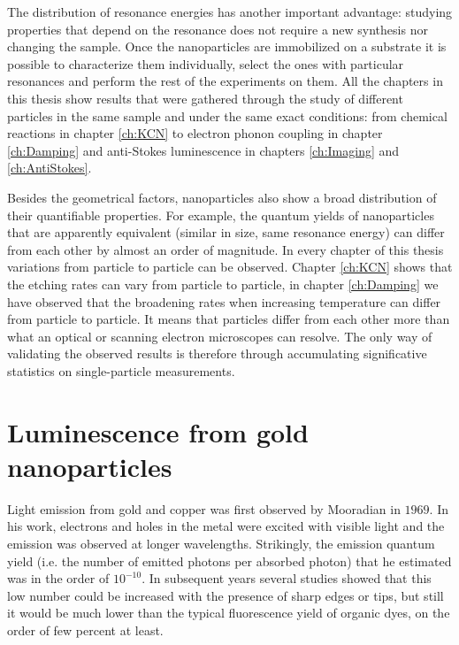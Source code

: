 The distribution of resonance energies has another important advantage: studying
properties that depend on the resonance does not require a new synthesis nor
changing the sample. Once the nanoparticles are immobilized on a substrate it is
possible to characterize them individually, select the ones with particular
resonances and perform the rest of the experiments on them. All the chapters in
this thesis show results that were gathered through the study of different
particles in the same sample and under the same exact conditions: from chemical
reactions in chapter \ref{ch:KCN} to electron phonon coupling in chapter
\ref{ch:Damping} and anti-Stokes luminescence in chapters \ref{ch:Imaging} and
\ref{ch:AntiStokes}.

Besides the geometrical factors, nanoparticles also show a broad distribution of
their quantifiable properties. For example, the quantum yields of nanoparticles
that are apparently equivalent (similar in size, same resonance energy) can
differ from each other by almost an order of magnitude\cite{Yorulmaz2012}. In
every chapter of this thesis variations from particle to particle can be
observed. Chapter \ref{ch:KCN} shows that the etching rates can vary from
particle to particle, in chapter \ref{ch:Damping} we have observed that the
broadening rates when increasing temperature can differ from particle to
particle. It means that particles differ from each other more than what an
optical or scanning electron microscopes can resolve. The only way of validating
the observed results is therefore through accumulating significative statistics
on single-particle measurements.

\section{Luminescence from gold nanoparticles}
\label{sec:luminescence}
Light emission from gold and copper was first observed by
Mooradian\cite{Mooradian1969} in $1969$. In his work, electrons and holes in the
metal were excited with visible light and the emission was observed at longer
wavelengths. Strikingly, the emission quantum yield (i.e. the number of emitted
photons per absorbed photon) that he estimated was in the order of $10^{-10}$.
In subsequent years several studies showed that this low number could be
increased with the presence of sharp edges\cite{boyd1986photoinduced} or
tips\cite{Mohamed2000}, but still it would be much lower than the typical
fluorescence yield of organic dyes, on the order of few percent at least.

